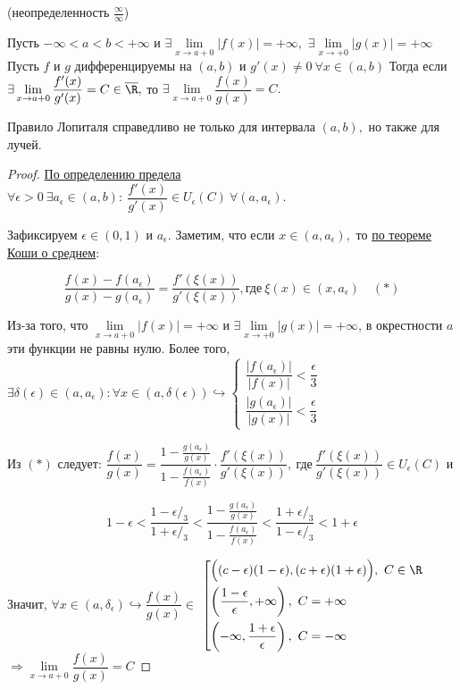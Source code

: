 \begin{theorem}
	\hypertarget{thrm5.21}{(неопределенность $\frac{\infty}{\infty}$)} Пусть $-\infty< a< b< +\infty$ и  $
		\exists \lim\limits_{x\to a+0} |f(x)| = + \infty,$
		$\exists \lim\limits_{x\to +0} |g(x)| = +\infty$ Пусть $f$ и $g$ дифференцируемы на $(a, b)$ и $g'(x) \neq 0 \ \forall x \in (a, b)$
		Тогда если $\exists \lim\limits_{x\to a+0} \dfrac{f'(x)}{g'(x)} = C\in \overline{\R},$ то $\exists \lim\limits_{x\to a+0} \dfrac{f(x)}{g(x)} = C.$
\end{theorem}
\begin{note}
	Правило Лопиталя справедливо не только для интервала $(a, b),$ но также для лучей. 
\end{note}
\begin{proof}
	\hyperlink{def4.3}{По определению предела} $\forall \epsilon > 0 \ \exists a_{\epsilon} \in (a, b): \ \dfrac{f'(x)}{g'(x)} \in U_{\epsilon}(C) \ \forall (a, a_{\epsilon}).$
	
	Зафиксируем $\epsilon \in (0, 1)$ и $a_{\epsilon}.$ Заметим, что если $x\in (a, a_{\epsilon}),$ то \hyperlink{5.11}{ по теореме Коши о среднем}: 
	
	$$\dfrac{f(x)-f(a_{\epsilon})}{g(x) - g(a_{\epsilon})} = \dfrac{f'(\xi(x))}{g'(\xi(x))}, \textrm{где} \ \xi (x) \in (x, a_{\epsilon})  \quad (*)$$
	
	Из-за того, что  $\lim\limits_{x\to a+0} |f(x)| = + \infty$ и $\exists \lim\limits_{x\to +0} |g(x)| = +\infty$, в окрестности $a$ эти функции не равны нулю. Более того, $\exists \delta(\epsilon) \in (a, a_{\epsilon}): \forall x \in (a, \delta(\epsilon)) \hookrightarrow \begin{cases}
		\dfrac{|f(a_{\epsilon})|}{|f(x)|} < \dfrac{\epsilon}{3} \\
		\dfrac{|g(a_{\epsilon})|}{|g(x)|} < \dfrac{\epsilon}{3}
	\end{cases}$
	
	Из $(*)$ следует: 
	$\dfrac{f(x)}{g(x)} = \dfrac{1-\frac{g(a_{\epsilon})}{g(x)}}{1-\frac{f(a_{\epsilon})}{f(x)}} \cdot \dfrac{f'(\xi(x))}{g'(\xi(x))},\ \textrm{где} \ \dfrac{f'(\xi(x))}{g'(\xi(x))} \in U_{\epsilon}(C)$ и 
	
	$$1-\epsilon < \dfrac{1-\epsilon/_3}{1+\epsilon/_3} < \dfrac{1-\frac{g(a_{\epsilon})}{g(x)}}{1-\frac{f(a_{\epsilon})}{f(x)}} < \dfrac{1+ \epsilon/_3}{1-\epsilon/_3} < 1+\epsilon$$
	
	Значит, $\forall x \in (a, \delta_{\epsilon}) \hookrightarrow \dfrac{f(x)}{g(x)} \in$ \footnotesize$ \left[\begin{gathered}
	\Big((c-\epsilon)(1-\epsilon), (c+\epsilon)(1+\epsilon)\Big), \ C \in \R \\
	\left(\frac{1-\epsilon}{\epsilon}, + \infty\right), \ C = +\infty  \hfill \\
	\left(- \infty, \frac{1+\epsilon}{\epsilon}\right), \ C = -\infty \hfill
	\end{gathered}\right. $\normalsize$ \Rightarrow\lim\limits_{x\to a+0} \dfrac{f(x)}{g(x)} = C$ 
\end{proof}

